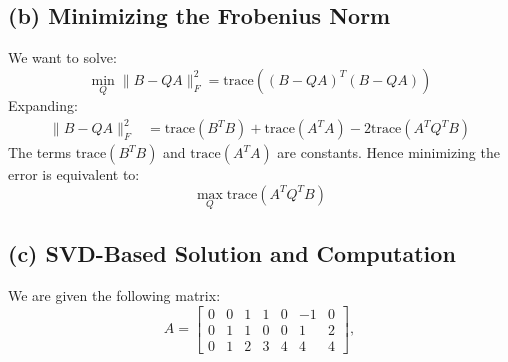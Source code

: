 \documentclass[12pt]{article}
\begin{document}
\subsection*{(b) Minimizing the Frobenius Norm}
We want to solve:
\[
\min_Q \| B - QA \|_F^2 = \text{trace}((B - QA)^T(B - QA))
\]
Expanding:
\begin{align*}
\| B - QA \|_F^2 &= \text{trace}(B^T B) + \text{trace}(A^T A) - 2\text{trace}(A^T Q^T B)
\end{align*}
The terms \( \text{trace}(B^T B) \) and \( \text{trace}(A^T A) \) are constants. Hence minimizing the error is equivalent to:
\[
\max_Q \text{trace}(A^T Q^T B)
\]

\subsection*{(c) SVD-Based Solution and Computation}
We are given the following matrix:
\[
A = \begin{bmatrix} 0 & 0 & 1 & 1 & 0 & -1 & 0 \\ 0 & 1 & 1 & 0 & 0 & 1 & 2 \\ 0 & 1 & 2 & 3 & 4 & 4 & 4 \end{bmatrix},
\]
\end{document}
